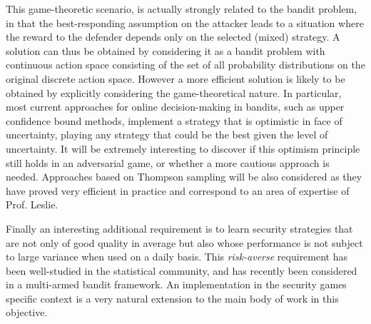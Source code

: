  This game-theoretic scenario, is actually strongly related to the bandit problem, in that the best-responding assumption on the attacker leads to a situation where the reward to the defender depends only on the selected (mixed) strategy.  A solution can thus be obtained by considering it as a bandit problem with continuous action space consisting of the set of all probability distributions on the original discrete action space.  However a more efficient solution is likely to be obtained by explicitly considering the game-theoretical nature.
%
In particular, most current approaches for online decision-making in bandits, such as upper confidence bound methods\cite{Auer02FA}, implement a strategy that is optimistic in face of uncertainty, playing any strategy that could be the best given the level of uncertainty. It will be extremely interesting to discover if this optimism principle still holds in an adversarial game, or whether a more cautious approach is needed.
Approaches based on Thompson sampling\cite{russo2014information} will be also considered as they have proved very efficient in practice and correspond to an area of expertise of Prof. Leslie.

Finally an interesting additional requirement is to learn security strategies that are not only of good quality in average but also whose performance is not subject to large variance when used on a daily basis. This {\em risk-averse} requirement has been well-studied in the statistical community, %
and has recently been considered in a multi-armed bandit framework\cite{NIPS2012_4753}. An implementation in the security games specific context is a very natural extension to the main body of work in this objective.





